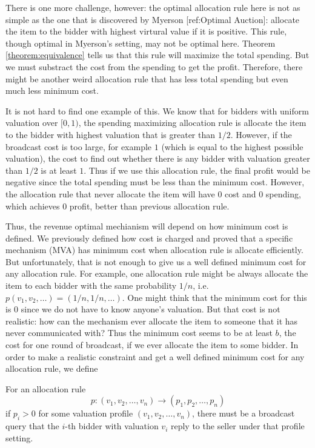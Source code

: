 There is one more challenge, however: the optimal allocation rule here
is not as simple as the one that is discovered by Myerson [ref:Optimal Auction]:
allocate the item to the bidder with highest virtural value if it is positive.
This rule, though optimal in Myerson's setting, may not be optimal here. Theorem
\ref{theorem:equivalence} tells us that this rule will maximize the total spending.
But we must substract the cost from the spending to get the profit. Therefore,
there might be another weird allocation rule that has less total spending but even
much less minimum cost.

It is not hard to find one example of this. We know that for bidders
with uniform valuation over $[0, 1)$, the spending maximizing allocation rule
is allocate the item to the bidder with highest valuation that is greater than $1/2$.
However, if the broadcast cost is too large, for example $1$ (which is equal to the
highest possible valuation), the cost to find out whether there is any bidder with valuation
greater than $1/2$ is at least $1$. Thus if we use this allocation rule, the
final profit would be negative since the total spending must be less than the
minimum cost. However, the allocation rule that never allocate the item will have
$0$ cost and $0$ spending, which achieves $0$ profit, better than previous allocation
rule.

Thus, the revenue optimal mechianism will depend on how minimum cost is defined. 
We previously defined how cost is charged and proved that a specific mechanism (MVA)
has minimum cost when allocation rule is allocate efficiently. But unfortunately,
that is not enough to give us a well defined minimum cost for any allocation rule.
For example, one allocation rule might be always allocate the item to each bidder
with the same probability $1/n$, i.e. $p(v_1, v_2, \ldots) = (1/n, 1/n, \ldots)$.
One might think that the minimum cost for this is $0$ since we do not have to know
anyone's valuation. But that cost is not realistic: how can the mechanism ever allocate the
item to someone that it has never communicated with? Thus the minimum cost seems
to be at least $b$, the cost for one round of broadcast, if we ever allocate the item
to some bidder. In order to make a realistic constraint and get a well defined minimum
cost for any allocation rule, we define

\begin{definition}\label{def:allocation_cost}
For an allocation rule $$p: (v_1, v_2, \ldots, v_n) \rightarrow (p_1, p_2,
\ldots, p_n)$$ if $p_i > 0$ for some valuation profile $(v_1, v_2, \ldots,
v_n)$, there must be a broadcast query that the $i$-th bidder with valuation
$v_i$ reply to the seller under that profile setting.
\end{definition}

